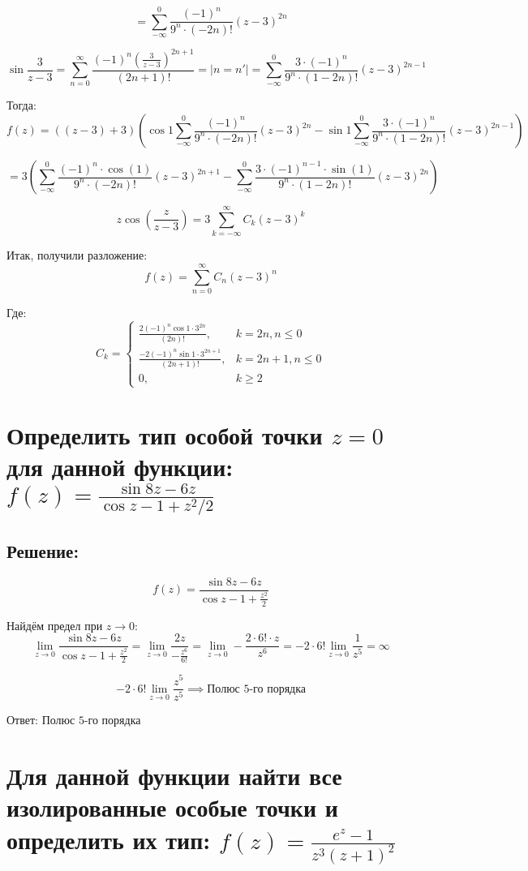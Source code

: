 \documentclass{article}
\begin{document}
\[
= \sum_{-\infty}^{0} \frac{(-1)^n}{9^n \cdot (-2n)!} (z-3)^{2n}
\]

\[
\sin \frac{3}{z-3} = \sum_{n=0}^{\infty} \frac{(-1)^n \left(\frac{3}{z-3}\right)^{2n+1}}{(2n+1)!} = \left|n = n'\right| = \sum_{-\infty}^{0} \frac{3 \cdot (-1)^n}{9^n \cdot (1 - 2n)!} (z-3)^{2n - 1}
\]

Тогда:
\[
f(z) = \left((z - 3) + 3\right) \left(\cos 1 \sum_{-\infty}^{0} \frac{(-1)^n}{9^n \cdot (-2n)!} (z-3)^{2n} - \sin 1 \sum_{-\infty}^{0} \frac{3 \cdot (-1)^n}{9^n \cdot (1 - 2n)!} (z-3)^{2n - 1}\right)
\]

\[
 = 3 \left(\sum_{-\infty}^{0} \frac{(-1)^n \cdot \cos(1)}{9^n \cdot (-2n)!} (z-3)^{2n + 1} - \sum_{-\infty}^{0} \frac{3 \cdot (-1)^{n-1} \cdot \sin(1)}{9^n \cdot (1 - 2n)!} (z-3)^{2n}\right)
\]

\[
z \cos\left(\frac{z}{z-3}\right) = 3\sum_{k =-\infty}^{\infty} C_k(z - 3)^k
\]

Итак, получили разложение:
\[
f(z) = \sum_{n=0}^{\infty} C_n (z-3)^n
\]

Где:
\[
C_k = 
\begin{cases} 
\frac{2(-1)^n \cos 1 \cdot 3^{2n}}{(2n)!}, & k = 2n, n \leqslant 0 \\ 
\frac{-2(-1)^n \sin 1 \cdot 3^{2n+1}}{(2n+1)!}, & k = 2n+1, n \leqslant 0 \\ 
0, & k \geqslant 2 
\end{cases}
\]

\section{Определить тип особой точки $z = 0$ для данной функции: $f(z) = \frac{\sin 8z - 6z}{\cos z - 1 + z^2 / 2}$}
\subsection{Решение:}

\[
f(z) = \frac{\sin 8z - 6z}{\cos z - 1 + \frac{z^2}{2}}
\]

Найдём предел при $z \to 0$:
\[
\lim_{z \to 0} \frac{\sin 8z - 6z}{\cos z - 1 + \frac{z^2}{2}} = \lim_{z \to 0} \frac{2z}{-\frac{z^6}{6!}} = \lim_{z \to 0} - \frac{2\cdot  6! \cdot z}{z^6} = - 2\cdot6! \lim_{z \to 0} \frac{1}{z^5} = \infty
\]

\[
- 2\cdot6! \lim_{z \to 0} \frac{z^5}{z^5} \implies \text{Полюс 5-го порядка}
\]

Ответ: $\text{Полюс 5-го порядка}$


\section{Для данной функции найти все изолированные особые точки и определить их тип: $f(z) = \frac{e^z - 1}{z^3 (z + 1)^2}$}
\end{document}
